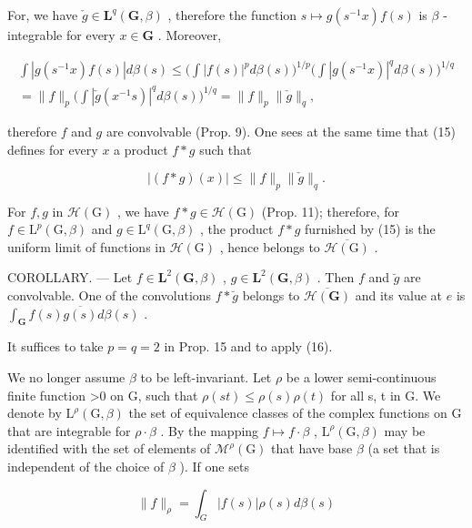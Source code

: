 For, we have \(\check{g} \in \mathbf{L}^q(\mathbf{G}, \beta)\) , therefore the function \(s \mapsto g(s^{-1}x)f(s)\) is \(\beta\) -integrable for every \(x \in \mathbf{G}\) . Moreover,

\[
\begin{array}{c} \int | g (s ^ {- 1} x) f (s) | d \beta (s) \leqslant \bigg (\int | f (s) | ^ {p} d \beta (s) \bigg) ^ {1 / p} \bigg (\int | g (s ^ {- 1} x) | ^ {q} d \beta (s) \bigg) ^ {1 / q} \\ = \| f \| _ {p} \bigg (\int | \check {g} (x ^ {- 1} s) | ^ {q} d \beta (s) \bigg) ^ {1 / q} = \| f \| _ {p} \| \check {g} \| _ {q}, \end{array}
\]

therefore \(f\) and \(g\) are convolvable (Prop. 9). One sees at the same time that (15) defines for every \(x\) a product \(f * g\) such that

\[
\left| (f * g) (x) \right| \leqslant \| f \| _ {p} \| \check {g} \| _ {q}.
\]

For \(f, g\) in \(\mathcal{H}(\mathrm{G})\) , we have \(f * g \in \mathcal{H}(\mathrm{G})\) (Prop. 11); therefore, for \(f \in \mathrm{L}^p(\mathrm{G}, \beta)\) and \(g \in \mathrm{L}^q(\mathrm{G}, \beta)\) , the product \(f * g\) furnished by (15) is the uniform limit of functions in \(\mathcal{H}(\mathrm{G})\) , hence belongs to \(\overline{\mathcal{H}(\mathrm{G})}\) .

COROLLARY. --- Let \(f \in \mathbf{L}^2(\mathbf{G}, \beta)\) , \(g \in \mathbf{L}^2(\mathbf{G}, \beta)\) . Then \(f\) and \(\breve{g}\) are convolvable. One of the convolutions \(f * \breve{g}\) belongs to \(\overline{\mathcal{H}(\mathbf{G})}\) and its value at \(e\) is \(\int_{\mathbf{G}} f(s) \overline{g(s)} d\beta(s)\) .

It suffices to take \(p = q = 2\) in Prop. 15 and to apply (16).

We no longer assume \(\beta\) to be left-invariant. Let \(\rho\) be a lower semi-continuous finite function \textgreater0 on G, such that \(\rho(st) \leqslant \rho(s)\rho(t)\) for all s, t in G. We denote by \(\mathrm{L}^{\rho}(\mathrm{G}, \beta)\) the set of equivalence classes of the complex functions on G that are integrable for \(\rho \cdot \beta\) . By the mapping \(f \mapsto f \cdot \beta\) , \(\mathrm{L}^{\rho}(\mathrm{G}, \beta)\) may be identified with the set of elements of \(\mathcal{M}^{\rho}(\mathrm{G})\) that have base \(\beta\) (a set that is independent of the choice of \(\beta\) ). If one sets

\[
\| f \| _ {\rho} = \int_ {G} | f (s) | \rho (s) d \beta (s)
\]

